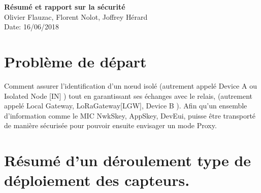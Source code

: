 \documentclass[a4paper, 11pt]{article}
\begin{document}
\noindent
\large\textbf{Résumé et rapport sur la sécurité} \\
\hfill Olivier Flauzac, Florent Nolot, Joffrey Hérard \\
\hfill Date: 16/06/2018 \\


\section*{Problème de départ }
Comment assurer l'identification d'un n\oe{}ud isolé (autrement appelé Device A ou Isolated Node [IN] ) tout en garantissant ses échanges avec le relais, (autrement appelé Local Gateway, LoRaGateway[LGW], Device B ). Afin qu'un ensemble d'information comme le MIC NwkSkey, AppSkey, DevEui, puisse être transporté de manière sécurisée pour pouvoir ensuite envisager un mode Proxy. 

\section*{Résumé d'un déroulement type de déploiement des capteurs.}
\end{document}
